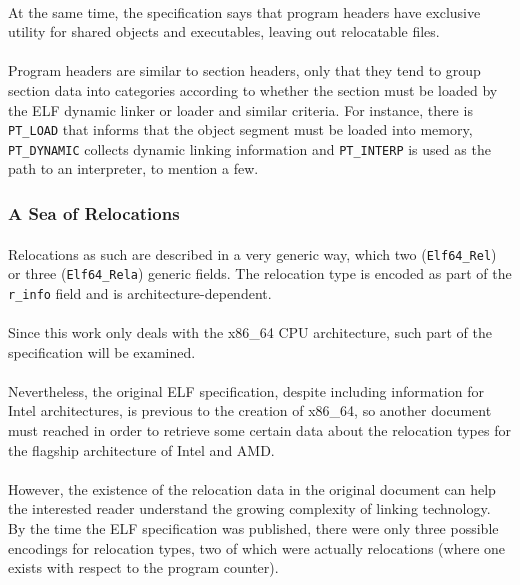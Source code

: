 \documentclass[12pt]{article}
\begin{document}
	\paragraph{}At the same time, the specification says that program headers have exclusive utility for shared objects and executables, leaving out relocatable files.
	\paragraph{}Program headers are similar to section headers, only that they tend to group section data into categories according to whether the section must be loaded by the \acrshort{ELF} dynamic linker or loader and similar criteria. For instance, there is \verb|PT_LOAD| that informs that the object segment must be loaded into memory, \verb|PT_DYNAMIC| collects dynamic linking information and \verb|PT_INTERP| is used as the path to an interpreter, to mention a few.
	
	\subsubsection{A Sea of Relocations}
	\paragraph{}Relocations as such are described in a very generic way, which two (\verb|Elf64_Rel|) or three (\verb|Elf64_Rela|) generic fields. The relocation type is encoded as part of the \verb|r_info| field and is architecture-dependent.
	\paragraph{}Since this work only deals with the x86\_64 CPU architecture, such part of the specification will be examined.
	\paragraph{}Nevertheless, the original \acrshort{ELF} specification, despite including information for Intel architectures, is previous to the creation of x86\_64, so another document must reached in order to retrieve some certain data about the relocation types for the flagship architecture of Intel and AMD.
	\paragraph{}However, the existence of the relocation data in the original document can help the interested reader understand the growing complexity of linking technology. By the time the \acrshort{ELF} specification was published, there were only three possible encodings for relocation types, two of which were actually relocations (where one exists with respect to the program counter).
	
\end{document}
